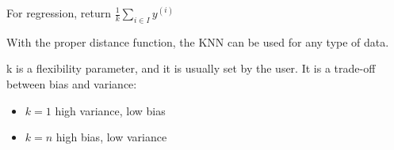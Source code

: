 For regression, return $\frac{1}{k}\sum_{i \in I}y^{(i)}$

With the proper distance function, the KNN can be used for any type of data.


k is a flexibility parameter, and it is usually set by the user. It is a trade-off between bias and variance:   
\begin{itemize}
    \item $k = 1$ \to high variance, low bias
    \item $k = n$ \to high bias, low variance
\end{itemize}


